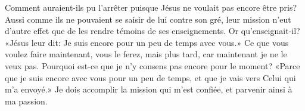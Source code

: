 Comment auraient-ils pu l’arrêter
	puisque Jésus ne voulait pas encore être pris?
Aussi comme ils ne pouvaient se saisir de lui contre son gré,
	leur mission n’eut d’autre effet
		que de les rendre témoins de ses enseignements.
Or qu’enseignait-il?
	«Jésus leur dit: Je suis encore pour un peu de temps avec vous.»
Ce que vous voulez faire maintenant, vous le ferez, mais plus tard,
	car maintenant je ne le veux pas.
Pourquoi est-ce que je n’y consens pas encore pour le moment?
	«Parce que je suis encore avec vous pour un peu de temps,
	et que je vais vers Celui qui m’a envoyé.»
Je dois accomplir la mission qui m’est confiée,
	et parvenir ainsi à ma passion.
